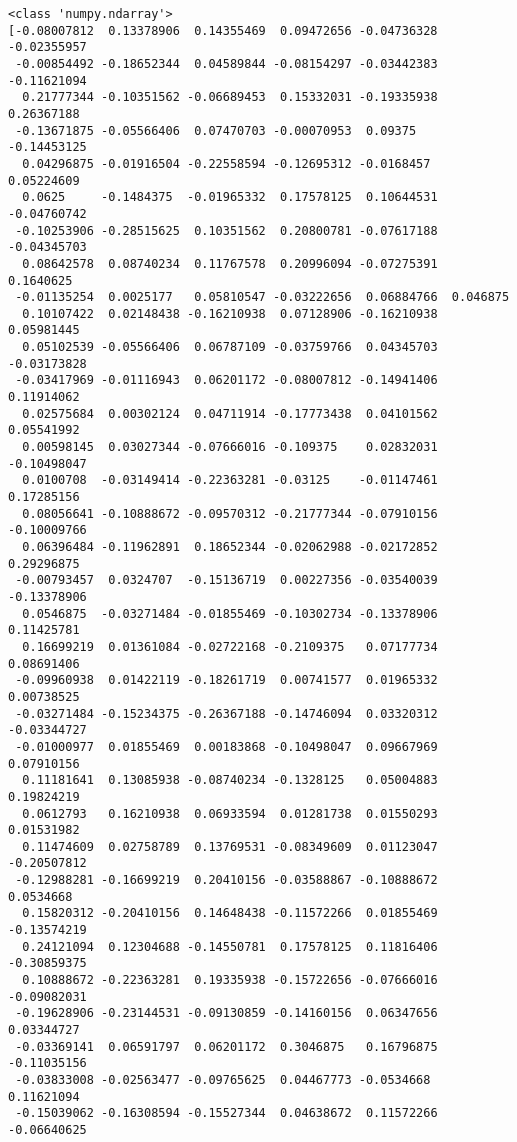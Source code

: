 \documentclass[11pt]{article}
\begin{document}
    \begin{Verbatim}[commandchars=\\\{\}]
<class 'numpy.ndarray'>
[-0.08007812  0.13378906  0.14355469  0.09472656 -0.04736328 -0.02355957
 -0.00854492 -0.18652344  0.04589844 -0.08154297 -0.03442383 -0.11621094
  0.21777344 -0.10351562 -0.06689453  0.15332031 -0.19335938  0.26367188
 -0.13671875 -0.05566406  0.07470703 -0.00070953  0.09375    -0.14453125
  0.04296875 -0.01916504 -0.22558594 -0.12695312 -0.0168457   0.05224609
  0.0625     -0.1484375  -0.01965332  0.17578125  0.10644531 -0.04760742
 -0.10253906 -0.28515625  0.10351562  0.20800781 -0.07617188 -0.04345703
  0.08642578  0.08740234  0.11767578  0.20996094 -0.07275391  0.1640625
 -0.01135254  0.0025177   0.05810547 -0.03222656  0.06884766  0.046875
  0.10107422  0.02148438 -0.16210938  0.07128906 -0.16210938  0.05981445
  0.05102539 -0.05566406  0.06787109 -0.03759766  0.04345703 -0.03173828
 -0.03417969 -0.01116943  0.06201172 -0.08007812 -0.14941406  0.11914062
  0.02575684  0.00302124  0.04711914 -0.17773438  0.04101562  0.05541992
  0.00598145  0.03027344 -0.07666016 -0.109375    0.02832031 -0.10498047
  0.0100708  -0.03149414 -0.22363281 -0.03125    -0.01147461  0.17285156
  0.08056641 -0.10888672 -0.09570312 -0.21777344 -0.07910156 -0.10009766
  0.06396484 -0.11962891  0.18652344 -0.02062988 -0.02172852  0.29296875
 -0.00793457  0.0324707  -0.15136719  0.00227356 -0.03540039 -0.13378906
  0.0546875  -0.03271484 -0.01855469 -0.10302734 -0.13378906  0.11425781
  0.16699219  0.01361084 -0.02722168 -0.2109375   0.07177734  0.08691406
 -0.09960938  0.01422119 -0.18261719  0.00741577  0.01965332  0.00738525
 -0.03271484 -0.15234375 -0.26367188 -0.14746094  0.03320312 -0.03344727
 -0.01000977  0.01855469  0.00183868 -0.10498047  0.09667969  0.07910156
  0.11181641  0.13085938 -0.08740234 -0.1328125   0.05004883  0.19824219
  0.0612793   0.16210938  0.06933594  0.01281738  0.01550293  0.01531982
  0.11474609  0.02758789  0.13769531 -0.08349609  0.01123047 -0.20507812
 -0.12988281 -0.16699219  0.20410156 -0.03588867 -0.10888672  0.0534668
  0.15820312 -0.20410156  0.14648438 -0.11572266  0.01855469 -0.13574219
  0.24121094  0.12304688 -0.14550781  0.17578125  0.11816406 -0.30859375
  0.10888672 -0.22363281  0.19335938 -0.15722656 -0.07666016 -0.09082031
 -0.19628906 -0.23144531 -0.09130859 -0.14160156  0.06347656  0.03344727
 -0.03369141  0.06591797  0.06201172  0.3046875   0.16796875 -0.11035156
 -0.03833008 -0.02563477 -0.09765625  0.04467773 -0.0534668   0.11621094
 -0.15039062 -0.16308594 -0.15527344  0.04638672  0.11572266 -0.06640625

\end{Verbatim}
\end{document}
